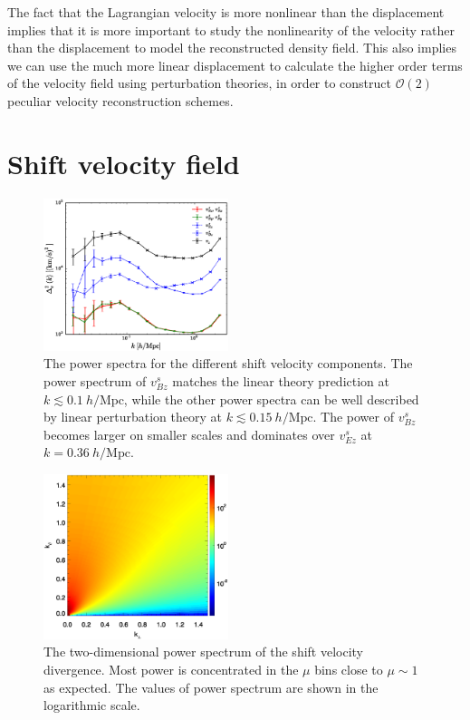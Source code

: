 \documentclass[aps,prd,twocolumn,superscriptaddress,groupedaddress,nofootinbib,amsfont]{revtex4}  %
\newcommand{\mr}{\mathrm}
\begin{document}
The fact that the Lagrangian velocity is more nonlinear than the displacement
implies that it is more important to study the nonlinearity of the velocity
rather than the displacement to model the reconstructed density field.
This also implies we can use the much more linear displacement to calculate
the higher order terms of the velocity field using perturbation theories, in 
order to construct $\mathcal{O}(2)$ peculiar velocity reconstruction schemes.


\section{Shift velocity field}
\label{appendix:C}

\begin{figure}[tbp]
\begin{center}
\includegraphics[width=0.48\textwidth]{f4.eps}
\end{center}
\vspace{-0.7cm}
\caption{The power spectra for the different shift velocity components.
The power spectrum of ${v^s_{Bz}}$ matches the linear theory prediction at 
$k\lesssim0.1\ h/\mr{Mpc}$, while the other power spectra can be well described 
by linear perturbation theory at $k\lesssim0.15\ h/\mr{Mpc}$. 
The power of $v^s_{Bz}$ becomes larger on smaller scales and dominates over 
$v^s_{Ez}$ at $k=0.36\ h/\mr{Mpc}$.}
\label{fig:pk_vels}
\end{figure}

\begin{figure}[tbp]
\vspace{-0.5cm}
\begin{center}
\includegraphics[width=0.48\textwidth]{0.000anipk_deltaV_4x.eps}
\end{center}
\vspace{-0.7cm}
\caption{The two-dimensional power spectrum of the shift velocity divergence.
Most power is concentrated in the $\mu$ bins close to $\mu\sim1$ as expected.
The values of power spectrum are shown in the logarithmic scale.}
\label{fig:pk_deltaV}
\end{figure}
\end{document}
